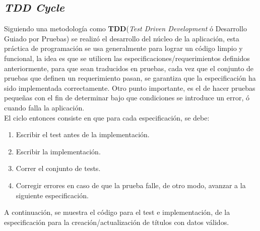 \subsection{\emph{TDD Cycle}}

Siguiendo una metodología como \textbf{TDD}(\emph{Test Driven Development} ó Desarrollo Guiado por Pruebas) se realizó el desarrollo del núcleo de la aplicación, esta práctica de programación se usa generalmente para lograr un código limpio y funcional, la idea es que se utilicen las especificaciones/requerimientos definidos anteriormente, para que sean traducidos en pruebas, cada vez que el conjunto de pruebas que definen un requerimiento pasan, se garantiza que la especificación ha sido implementada correctamente. Otro punto importante, es el de hacer pruebas pequeñas con el fin de determinar bajo que condiciones se introduce un error, ó cuando falla la aplicación.\\

El ciclo entonces consiste en que para cada especificación, se debe:
\begin{enumerate}
\item Escribir el test antes de la implementación.
\item Escribir la implementación.
\item Correr el conjunto de tests.
\item Corregir errores en caso de que la prueba falle, de otro modo, avanzar a la siguiente especificación.
\end{enumerate}

A continuación, se muestra el código para el test e implementación, de la especificación para la creación/actualización de títulos con datos válidos.\\

